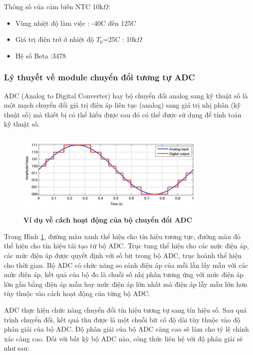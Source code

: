 \documentclass{article} %
\begin{document}
	Thông số của cảm biến NTC 10k$\Omega$:
	\begin{itemize}
		\item Vùng nhiệt độ làm việc : -40\textdegree C đến 125\textdegree C
		\item Giá trị điện trở ở nhiệt độ $T_0$=25\textdegree C : 10k$\Omega$
		\item Hệ số Beta :3478
	\end{itemize}
	
	\subsubsection{Lý thuyết về module chuyển đổi tương tự ADC}
	
	ADC (Analog to Digital Converter) hay bộ chuyển đổi analog sang kỹ thuật số là một mạch chuyển đổi giá trị điện áp liên tục (analog) sang giá trị nhị phân (kỹ thuật số) mà thiết bị có thể hiểu được sau đó có thể được sử dụng để tính toán kỹ thuật số.
	
	\begin{figure}[!ht]
		\centering
		\includegraphics[width=9.5cm,height=4.2cm]{Images/ADC.png}
		\caption[Ví dụ về cách hoạt động của bộ chuyển đổi ADC\cite{Analog}]{\bfseries \fontsize{12pt}{0pt}\selectfont Ví dụ về cách hoạt động của bộ chuyển đổi ADC\cite{Analog}}
		\label{ADC}
	\end{figure}
	
	Trong Hình \ref{ADC}, đường màu xanh thể hiện cho tín hiệu tương tực, đường màu đỏ thể hiện cho tín hiệu tái tạo từ bộ ADC. Trục tung thể hiện cho các mức điện áp, các mức điện áp được quyết định với số bit trong bộ ADC, trục hoành thể hiện cho thời gian. Bộ ADC có chức năng so sánh điện áp của mỗi lần lấy mẫu với các mức điện áp, kết quả của bộ đo là chuỗi số nhị phân tương ứng với mức điện áp lớn gần bằng điện áp mẫu hay mức điện áp lớn nhất mà điện áp lẫy mẫu lớn hơn tùy thuộc vào cách hoạt động của từng bộ ADC.
	
	ADC thực hiện chức năng chuyển đổi tín hiệu tương tự sang tín hiệu số. Sau quá trình chuyển đổi, kết quả thu được là một chuỗi bit có độ dài tùy thuộc vào độ phân giải của bộ ADC. Độ phân giải của bộ ADC càng cao sẽ làm cho tỷ lệ chính xác càng cao. Đối với bất kỳ bộ ADC nào, công thức liên hệ với độ phân giải sẽ như sau: 
	
\end{document}
